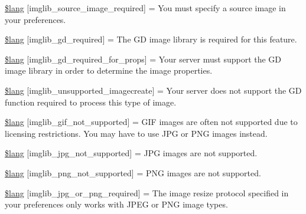 \begin{DoxyCompactItemize}
\item 
\mbox{\hyperlink{imglib__lang_8php_a0e78e52ac28b62198df5426515ee244a}{\$lang}} \mbox{[}\textquotesingle{}imglib\+\_\+source\+\_\+image\+\_\+required\textquotesingle{}\mbox{]} = \textquotesingle{}You must specify a source image in your preferences.\textquotesingle{}
\item 
\mbox{\hyperlink{imglib__lang_8php_ae6dd0286e69bea8e877cd8baf8de324d}{\$lang}} \mbox{[}\textquotesingle{}imglib\+\_\+gd\+\_\+required\textquotesingle{}\mbox{]} = \textquotesingle{}The GD image library is required for this feature.\textquotesingle{}
\item 
\mbox{\hyperlink{imglib__lang_8php_ad69126a87cfb27620a5d58be46563bcd}{\$lang}} \mbox{[}\textquotesingle{}imglib\+\_\+gd\+\_\+required\+\_\+for\+\_\+props\textquotesingle{}\mbox{]} = \textquotesingle{}Your server must support the GD image library in order to determine the image properties.\textquotesingle{}
\item 
\mbox{\hyperlink{imglib__lang_8php_a9dc04ad51d5895995c4acfb1c85a91a9}{\$lang}} \mbox{[}\textquotesingle{}imglib\+\_\+unsupported\+\_\+imagecreate\textquotesingle{}\mbox{]} = \textquotesingle{}Your server does not support the GD function required to process this type of image.\textquotesingle{}
\item 
\mbox{\hyperlink{imglib__lang_8php_ae2e1546517c4009456862caccbb29751}{\$lang}} \mbox{[}\textquotesingle{}imglib\+\_\+gif\+\_\+not\+\_\+supported\textquotesingle{}\mbox{]} = \textquotesingle{}G\+IF images are often not supported due to licensing restrictions. You may have to use J\+PG or P\+NG images instead.\textquotesingle{}
\item 
\mbox{\hyperlink{imglib__lang_8php_a6c8f078ef05e97a16b8765f982d9d880}{\$lang}} \mbox{[}\textquotesingle{}imglib\+\_\+jpg\+\_\+not\+\_\+supported\textquotesingle{}\mbox{]} = \textquotesingle{}J\+PG images are not supported.\textquotesingle{}
\item 
\mbox{\hyperlink{imglib__lang_8php_aab97ef0400eb277eb78af8b9709d3aa4}{\$lang}} \mbox{[}\textquotesingle{}imglib\+\_\+png\+\_\+not\+\_\+supported\textquotesingle{}\mbox{]} = \textquotesingle{}P\+NG images are not supported.\textquotesingle{}
\item 
\mbox{\hyperlink{imglib__lang_8php_ab63bd5a170e4132141fa0db22343ee56}{\$lang}} \mbox{[}\textquotesingle{}imglib\+\_\+jpg\+\_\+or\+\_\+png\+\_\+required\textquotesingle{}\mbox{]} = \textquotesingle{}The image resize protocol specified in your preferences only works with J\+P\+EG or P\+NG image types.\textquotesingle{}

\end{DoxyCompactItemize}
